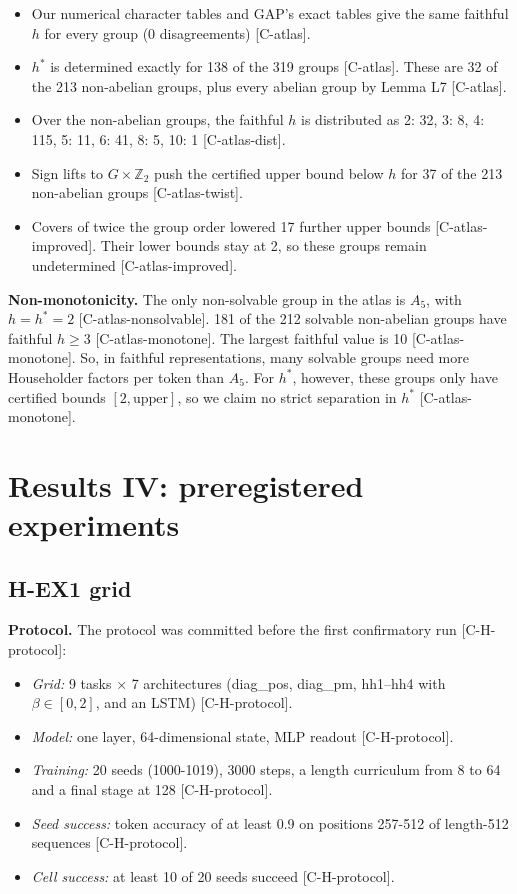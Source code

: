 \documentclass[10pt,twocolumn,a4paper]{article}
\providecommand{\tightlist}{\setlength{\itemsep}{0pt}\setlength{\parskip}{0pt}}
\begin{document}
\begin{itemize}
\tightlist
\item
  Our numerical character tables and GAP's exact tables give the same faithful \(h\) for every group (0 disagreements) {[}C-atlas{]}.
\item
  \(h^*\) is determined exactly for 138 of the 319 groups {[}C-atlas{]}. These are 32 of the 213 non-abelian groups, plus every abelian group by Lemma L7 {[}C-atlas{]}.
\item
  Over the non-abelian groups, the faithful \(h\) is distributed as 2: 32, 3: 8, 4: 115, 5: 11, 6: 41, 8: 5, 10: 1 {[}C-atlas-dist{]}.
\item
  Sign lifts to \(G \times \mathbb{Z}_2\) push the certified upper bound below \(h\) for 37 of the 213 non-abelian groups {[}C-atlas-twist{]}.
\item
  Covers of twice the group order lowered 17 further upper bounds {[}C-atlas-improved{]}. Their lower bounds stay at 2, so these groups remain undetermined {[}C-atlas-improved{]}.
\end{itemize}

\textbf{Non-monotonicity.} The only non-solvable group in the atlas is \(A_5\), with \(h = h^* = 2\) {[}C-atlas-nonsolvable{]}. 181 of the 212 solvable non-abelian groups have faithful \(h \ge 3\) {[}C-atlas-monotone{]}. The largest faithful value is 10 {[}C-atlas-monotone{]}. So, in faithful representations, many solvable groups need more Householder factors per token than \(A_5\). For \(h^*\), however, these groups only have certified bounds \([2,\text{upper}]\), so we claim no strict separation in \(h^*\) {[}C-atlas-monotone{]}.

\section{Results IV: preregistered experiments}\label{results-iv-preregistered-experiments}

\subsection{H-EX1 grid}\label{h-ex1-grid}

\textbf{Protocol.} The protocol was committed before the first confirmatory run {[}C-H-protocol{]}:

\begin{itemize}
\tightlist
\item
  \emph{Grid:} 9 tasks × 7 architectures (diag\_pos, diag\_pm, hh1--hh4 with \(\beta \in [0,2]\), and an LSTM) {[}C-H-protocol{]}.
\item
  \emph{Model:} one layer, 64-dimensional state, MLP readout {[}C-H-protocol{]}.
\item
  \emph{Training:} 20 seeds (1000-1019), 3000 steps, a length curriculum from 8 to 64 and a final stage at 128 {[}C-H-protocol{]}.
\item
  \emph{Seed success:} token accuracy of at least 0.9 on positions 257-512 of length-512 sequences {[}C-H-protocol{]}.
\item
  \emph{Cell success:} at least 10 of 20 seeds succeed {[}C-H-protocol{]}.
\end{itemize}
\end{document}
